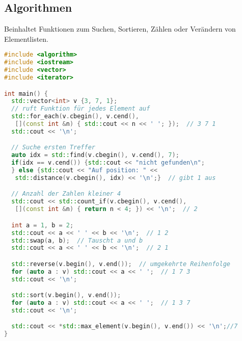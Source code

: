 \subsection{Algorithmen}

Beinhaltet Funktionen zum Suchen, Sortieren, Zählen oder Verändern von
Elementlisten.

\begin{lstlisting}[language=C++]
#include <algorithm>
#include <iostream>
#include <vector>
#include <iterator>

int main() {
  std::vector<int> v {3, 7, 1};
  // ruft Funktion für jedes Element auf
  std::for_each(v.cbegin(), v.cend(),
   [](const int &n) { std::cout << n << ' '; });  // 3 7 1
  std::cout << '\n';

  // Suche ersten Treffer
  auto idx = std::find(v.cbegin(), v.cend(), 7);
  if(idx == v.cend()) {std::cout << "nicht gefunden\n";
  } else {std::cout << "Auf position: " <<
   std::distance(v.cbegin(), idx) << '\n';}  // gibt 1 aus

  // Anzahl der Zahlen kleiner 4
  std::cout << std::count_if(v.cbegin(), v.cend(),
   [](const int &n) { return n < 4; }) << '\n';  // 2

  int a = 1, b = 2;
  std::cout << a << ' ' << b << '\n';  // 1 2
  std::swap(a, b);  // Tauscht a und b
  std::cout << a << ' ' << b << '\n';  // 2 1

  std::reverse(v.begin(), v.end());  // umgekehrte Reihenfolge
  for (auto a : v) std::cout << a << ' ';  // 1 7 3
  std::cout << '\n';

  std::sort(v.begin(), v.end());
  for (auto a : v) std::cout << a << ' ';  // 1 3 7
  std::cout << '\n';

  std::cout << *std::max_element(v.begin(), v.end()) << '\n';//7
}
\end{lstlisting}

